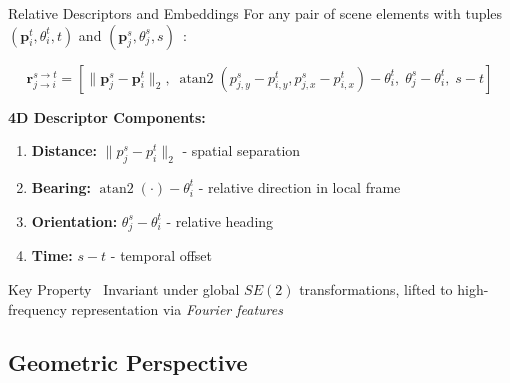 \documentclass[10pt,aspectratio=169]{beamer}
\DeclareMathOperator{\atan}{atan2}
\begin{document}
\begin{frame}{Relative Descriptors and Embeddings}
For any pair of scene elements with tuples $(\mathbf{p}_i^t, \theta_i^t, t)$ and $(\mathbf{p}_j^s, \theta_j^s, s)$~\cite{qcnetZhou2023}:

\begin{equation}
\mathbf{r}_{j\to i}^{s\to t} = \left[
    \|\mathbf{p}_j^s-\mathbf{p}_i^t\|_2,\;
    \atan(p_{j,y}^s-p_{i,y}^t, p_{j,x}^s-p_{i,x}^t)-\theta_i^t,\;
    \theta_j^s-\theta_i^t,\;
    s-t
\right]
\end{equation}

\vspace{0.5cm}

\textbf{4D Descriptor Components:}    \begin{enumerate}
    \item \textbf{Distance:} $\|p_j^s-p_i^t\|_2$ - spatial separation
    \item \textbf{Bearing:} $\atan(\cdot)-\theta_i^t$ - relative direction in local frame
    \item \textbf{Orientation:} $\theta_j^s-\theta_i^t$ - relative heading
    \item \textbf{Time:} $s-t$ - temporal offset
\end{enumerate}

\begin{block}{Key Property~\cite{qcnetZhou2023}}
Invariant under global $SE(2)$ transformations, lifted to high-frequency representation via \emph{Fourier features}
\end{block}
\end{frame}

\subsection{Geometric Perspective}
\end{document}
